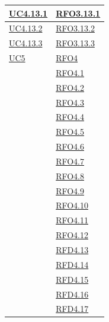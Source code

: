 \begin{itemize}
\begin{itemize}
\begin{itemize}
\begin{itemize}
\begin{longtable}{|>{\centering}m{5cm}|m{5cm}<{\centering}|}
\hyperref[UC4.13.1]{UC4.13.1} & \hyperlink{RFO3.13.1}{RFO3.13.1}\\ \hline
\hyperref[UC4.13.2]{UC4.13.2} & \hyperlink{RFO3.13.2}{RFO3.13.2}\\ \hline
\hyperref[UC4.13.3]{UC4.13.3} & \hyperlink{RFO3.13.3}{RFO3.13.3}\\ \hline

\hyperref[UC5]{UC5} & \hyperlink{RFO4}{RFO4}\\
& \hyperlink{RFO4.1}{RFO4.1}\\
& \hyperlink{RFO4.2}{RFO4.2}\\
& \hyperlink{RFO4.3}{RFO4.3}\\
& \hyperlink{RFO4.4}{RFO4.4}\\
& \hyperlink{RFO4.5}{RFO4.5}\\
& \hyperlink{RFO4.6}{RFO4.6}\\
& \hyperlink{RFO4.7}{RFO4.7}\\
& \hyperlink{RFO4.8}{RFO4.8}\\
& \hyperlink{RFO4.9}{RFO4.9}\\
& \hyperlink{RFO4.10}{RFO4.10}\\
& \hyperlink{RFO4.11}{RFO4.11}\\
& \hyperlink{RFO4.12}{RFO4.12}\\
& \hyperlink{RFD4.13}{RFD4.13}\\
& \hyperlink{RFD4.14}{RFD4.14}\\
& \hyperlink{RFD4.15}{RFD4.15}\\
& \hyperlink{RFD4.16}{RFD4.16}\\
& \hyperlink{RFD4.17}{RFD4.17}\\


\end{longtable}
\end{itemize}
\end{itemize}
\end{itemize}
\end{itemize}
